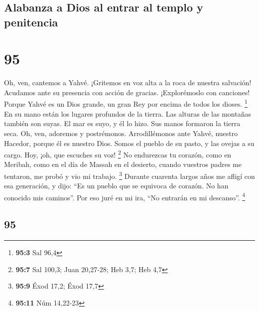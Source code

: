 \begin{paracol}{2}
\hypertarget{alabanza-a-dios-al-entrar-al-templo-y-penitencia}{%
\subsection{Alabanza a Dios al entrar al templo y
penitencia}\label{alabanza-a-dios-al-entrar-al-templo-y-penitencia}}

\hypertarget{section-188}{%
\section{95}\label{section-188}}

 Oh, ven, cantemos a Yahvé. ¡Gritemos en voz alta a la
roca de nuestra salvación!  Acudamos ante su presencia con
acción de gracias. ¡Explorémoslo con canciones!  Porque
Yahvé es un Dios grande, un gran Rey por encima de todos los dioses.
\footnote{\textbf{95:3} Sal 96,4}  En su mano están los
lugares profundos de la tierra. Las alturas de las montañas también son
suyas.  El mar es suyo, y él lo hizo. Sus manos formaron
la tierra seca.  Oh, ven, adoremos y postrémonos.
Arrodillémonos ante Yahvé, nuestro Hacedor,  porque él es
nuestro Dios. Somos el pueblo de su pasto, y las ovejas a su cargo. Hoy,
¡oh, que escuches su voz! \footnote{\textbf{95:7} Sal 100,3; Juan
  20,27-28; Heb 3,7; Heb 4,7}  No endurezcas tu corazón,
como en Meribah, como en el día de Massah en el desierto, 
cuando vuestros padres me tentaron, me probó y vio mi trabajo.
\footnote{\textbf{95:9} Éxod 17,2; Éxod 17,7}  Durante
cuarenta largos años me afligí con esa generación, y dijo: ``Es un
pueblo que se equivoca de corazón. No han conocido mis caminos''.
 Por eso juré en mi ira, ``No entrarán en mi descanso''.
\footnote{\textbf{95:11} Núm 14,22-23}

\switchcolumn
\begin{otherlanguage}{english}

\hypertarget{section-189}{%
\section{95}\label{section-189}}


\end{otherlanguage}
\end{paracol}
